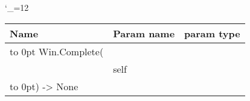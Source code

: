 \begingroup \catcode`\_=12 \tt
\begin{tabular}{lll}
\toprule
\textrm{Name}&\textrm{Param name}&\textrm{param type}\\
\midrule
\hbox to 0pt {Win.Complete(\hss}\\
& self\\
\hbox to 0pt{) -> None\hss}\\
\bottomrule
\end{tabular}
\endgroup
